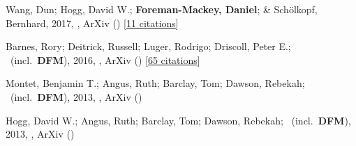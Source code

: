 \item[{\color{numcolor}\scriptsize4}] Wang, Dun; Hogg, David W.; \textbf{Foreman-Mackey, Daniel}; \& Sch{\"o}lkopf, Bernhard, 2017, , ArXiv () [\href{https://ui.adsabs.harvard.edu/abs/2017arXiv171002428W}{11 citations}]

\item[{\color{numcolor}\scriptsize3}] Barnes, Rory; Deitrick, Russell; Luger, Rodrigo; Driscoll, Peter E.; \etal\ (incl.\ \textbf{DFM}), 2016, , ArXiv () [\href{https://ui.adsabs.harvard.edu/abs/2016arXiv160806919B}{65 citations}]

\item[{\color{numcolor}\scriptsize2}] Montet, Benjamin T.; Angus, Ruth; Barclay, Tom; Dawson, Rebekah; \etal\ (incl.\ \textbf{DFM}), 2013, , ArXiv ()

\item[{\color{numcolor}\scriptsize1}] Hogg, David W.; Angus, Ruth; Barclay, Tom; Dawson, Rebekah; \etal\ (incl.\ \textbf{DFM}), 2013, , ArXiv ()